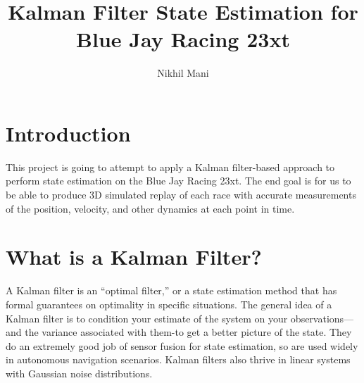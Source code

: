 \documentclass{article}
\title{Kalman Filter State Estimation for Blue Jay Racing 23xt}
\author{Nikhil Mani}
\begin{document}
\maketitle
\tableofcontents
\section{Introduction}

This project is going to attempt to apply a Kalman filter-based approach to perform state estimation on the Blue Jay Racing 23xt. The end goal is for us to be able to produce 3D simulated replay of each race with accurate measurements of the position, velocity, and other dynamics at each point in time.

\section{What is a Kalman Filter?}

A Kalman filter is an ``optimal filter,'' or a state estimation method that has formal guarantees on optimality in specific situations. The general idea of a Kalman filter is to condition your estimate of the system on your observations—and the variance associated with them-to get a better picture of the state. They do an extremely good job of sensor fusion for state estimation, so are used widely in autonomous navigation scenarios. Kalman filters also thrive in linear systems with Gaussian noise distributions.
\end{document}
